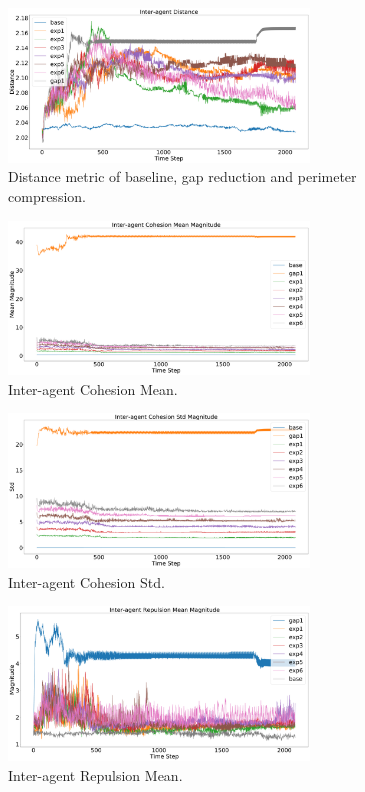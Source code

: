 \documentclass[12pt,a4paper]{IEEEtran}
\begin{document}
\begin{figure}[H]
	\begin{center}
		\includegraphics[width=8cm]{figures/DistanceMetric1}
	\end{center}
	\caption{Distance metric of baseline, gap reduction and perimeter compression. \label{fig:distanceMetric}}
\end{figure}

\begin{figure}[H]
	\begin{center}
		\includegraphics[width=8cm]{figures/InteragentCohesionMean}
	\end{center}
	\caption{Inter-agent Cohesion Mean. \label{fig:interagentCohesionMean}}
\end{figure}

\begin{figure}[H]
	\begin{center}
		\includegraphics[width=8cm]{figures/InteragentCohesionStd}
	\end{center}
	\caption{Inter-agent Cohesion Std. \label{fig:interagentCohesionStd}}
\end{figure}

\begin{figure}[H]
	\begin{center}
		\includegraphics[width=8cm]{figures/InteragentRepulsionMean}
	\end{center}
	\caption{Inter-agent Repulsion Mean. \label{fig:interagentRepulsionMean}}
\end{figure}
\end{document}
